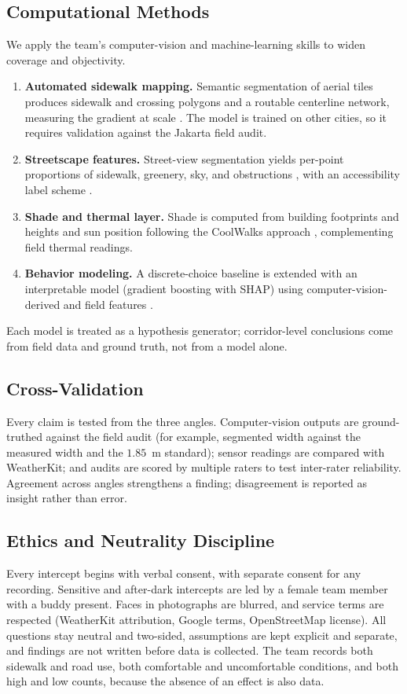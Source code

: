 \documentclass[conference]{IEEEtran}
\begin{document}
\subsection{Computational Methods}
We apply the team's computer-vision and machine-learning skills to widen coverage and objectivity.
\begin{enumerate}
  \item \textbf{Automated sidewalk mapping.} Semantic segmentation of aerial tiles produces
        sidewalk and crossing polygons and a routable centerline network, measuring the gradient at
        scale \autocite{tile2net2023}. The model is trained on other cities, so it requires
        validation against the Jakarta field audit.
  \item \textbf{Streetscape features.} Street-view segmentation yields per-point proportions of
        sidewalk, greenery, sky, and obstructions \autocite{walkabilitydl2024}, with an
        accessibility label scheme \autocite{projectsidewalk2019}.
  \item \textbf{Shade and thermal layer.} Shade is computed from building footprints and heights
        and sun position following the CoolWalks approach \autocite{coolwalks2025}, complementing
        field thermal readings.
  \item \textbf{Behavior modeling.} A discrete-choice baseline \autocite{afkara2020walking} is
        extended with an interpretable model (gradient boosting with SHAP) using
        computer-vision-derived and field features \autocite{routechoiceml2024}.
\end{enumerate}
Each model is treated as a hypothesis generator; corridor-level conclusions come from field data
and ground truth, not from a model alone.

\subsection{Cross-Validation}
Every claim is tested from the three angles. Computer-vision outputs are ground-truthed against the
field audit (for example, segmented width against the measured width and the $1.85$~m standard);
sensor readings are compared with WeatherKit; and audits are scored by multiple raters to test
inter-rater reliability. Agreement across angles strengthens a finding; disagreement is reported as
insight rather than error.

\subsection{Ethics and Neutrality Discipline}
Every intercept begins with verbal consent, with separate consent for any recording. Sensitive and
after-dark intercepts are led by a female team member with a buddy present. Faces in photographs
are blurred, and service terms are respected (WeatherKit attribution, Google terms, OpenStreetMap
license). All questions stay neutral and two-sided, assumptions are kept explicit and separate, and
findings are not written before data is collected. The team records both sidewalk and road use,
both comfortable and uncomfortable conditions, and both high and low counts, because the absence of
an effect is also data.
\end{document}
